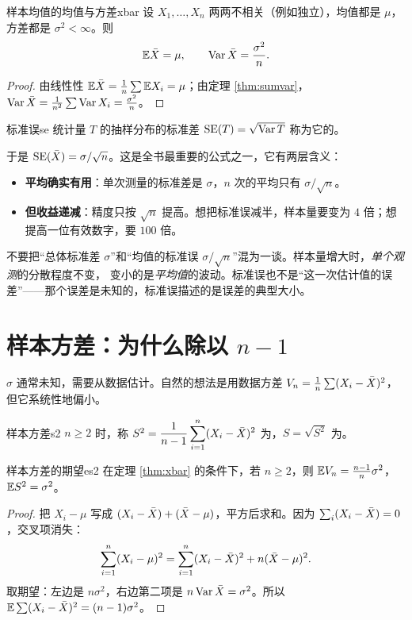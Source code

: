 \begin{theorem}{样本均值的均值与方差}{xbar}
设 $X_1,\dots,X_n$ 两两不相关（例如独立），均值都是 $\mu$，方差都是 $\sigma^2<\infty$。则
\[
\mathbb{E}\bar{X}=\mu,\qquad \operatorname{Var}\bar{X}=\frac{\sigma^2}{n}.
\]
\end{theorem}
\begin{proof}
由线性性 $\mathbb{E}\bar{X}=\frac1n\sum\mathbb{E} X_i=\mu$；由定理 \ref{thm:sumvar}，$\operatorname{Var}\bar{X}=\frac1{n^2}\sum\operatorname{Var} X_i=\frac{\sigma^2}{n}$。
\end{proof}

\begin{definition}{标准误}{se}
统计量 $T$ 的抽样分布的标准差 $\operatorname{SE}(T)=\sqrt{\operatorname{Var} T}$ 称为它的。
\end{definition}

于是 $\operatorname{SE}(\bar{X})=\sigma/\sqrt n$。这是全书最重要的公式之一，它有两层含义：
\begin{itemize}
\item \textbf{平均确实有用}：单次测量的标准差是 $\sigma$，$n$ 次的平均只有 $\sigma/\sqrt n$。
\item \textbf{但收益递减}：精度只按 $\sqrt n$ 提高。想把标准误减半，样本量要变为 $4$ 倍；想提高一位有效数字，要 $100$ 倍。
\end{itemize}

\begin{warning}
不要把“总体标准差 $\sigma$”和“均值的标准误 $\sigma/\sqrt n$”混为一谈。样本量增大时，\emph{单个观测}的分散程度不变，
变小的是\emph{平均值}的波动。标准误也不是“这一次估计值的误差”——那个误差是未知的，标准误描述的是误差的典型大小。
\end{warning}

\section{样本方差：为什么除以 \texorpdfstring{$n-1$}{n-1}}

$\sigma$ 通常未知，需要从数据估计。自然的想法是用数据方差 $V_n=\frac1n\sum(X_i-\bar{X})^2$，但它系统性地偏小。

\begin{definition}{样本方差}{s2}
$n\ge2$ 时，称 $S^2=\dfrac1{n-1}\displaystyle\sum_{i=1}^n(X_i-\bar{X})^2$ 为，$S=\sqrt{S^2}$ 为。
\end{definition}

\begin{theorem}{样本方差的期望}{es2}
在定理 \ref{thm:xbar} 的条件下，若 $n\ge2$，则 $\mathbb{E} V_n=\frac{n-1}{n}\sigma^2$，$\mathbb{E} S^2=\sigma^2$。
\end{theorem}
\begin{proof}
把 $X_i-\mu$ 写成 $(X_i-\bar{X})+(\bar{X}-\mu)$，平方后求和。因为 $\sum_i(X_i-\bar{X})=0$，交叉项消失：
\begin{equation}\label{eq:ssdecomp}
\sum_{i=1}^n(X_i-\mu)^2=\sum_{i=1}^n(X_i-\bar{X})^2+n(\bar{X}-\mu)^2 .
\end{equation}
取期望：左边是 $n\sigma^2$，右边第二项是 $n\operatorname{Var}\bar{X}=\sigma^2$。所以 $\mathbb{E}\sum(X_i-\bar{X})^2=(n-1)\sigma^2$。
\end{proof}

